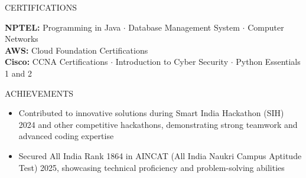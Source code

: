 \documentclass{resume}
\begin{document}
\begin{rSection}{CERTIFICATIONS}

\textbf{NPTEL:} Programming in Java $\cdot$ Database Management System $\cdot$ Computer Networks \\[1pt]
\textbf{AWS:} Cloud Foundation Certifications \\[1pt]
\textbf{Cisco:} CCNA Certifications $\cdot$ Introduction to Cyber Security $\cdot$ Python Essentials 1 and 2

\end{rSection}

\begin{rSection}{ACHIEVEMENTS}

\begin{itemize}[leftmargin=12pt, itemsep=0pt, label={\small$\bullet$}]
\item Contributed to innovative solutions during Smart India Hackathon (SIH) 2024 and other competitive hackathons, demonstrating strong teamwork and advanced coding expertise
\item Secured All India Rank 1864 in AINCAT (All India Naukri Campus Aptitude Test) 2025, showcasing technical proficiency and problem-solving abilities
\end{itemize}

\end{rSection}
\end{document}
